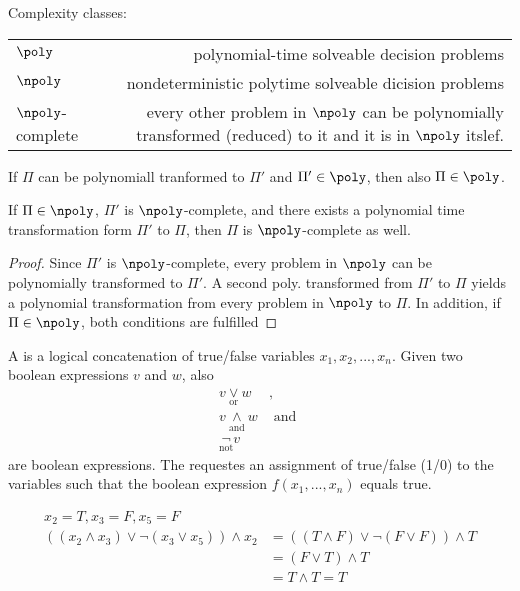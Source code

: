 \begin{lec}[2011-12-19]\end{lec}

Complexity classes:

\begin{tabular}{l|r}
	$\poly$ & polynomial-time solveable decision problems \\
	$\npoly$ & nondeterministic polytime solveable dicision problems \\
	$\npoly$-complete & every other problem in $\npoly$ can be polynomially transformed (reduced) to it and it is in $\npoly$ itslef.
\end{tabular}

\begin{rem}
	If $\Pi$ can be polynomiall tranformed to $\Pi'$ and $\Pi'\in \poly$, then also $\Pi \in \poly$.
\end{rem}

\begin{cor}
	If $\Pi \in \npoly$, $\Pi'$ is $\npoly$-complete, and there exists a polynomial time transformation form $\Pi'$ to $\Pi$, then $\Pi$ is $\npoly$-complete as well.
\end{cor}
\begin{proof}
Since $\Pi'$ is $\npoly$-complete, every problem in $\npoly$ can be polynomially transformed to $\Pi'$. A second poly. transformed from $\Pi'$ to $\Pi$ yields a polynomial transformation from every problem in $\npoly$ to $\Pi$. In addition, if $\Pi \in \npoly$, both conditions are fulfilled
\end{proof}

\begin{defn}
A  is a logical concatenation of true/false variables $x_1, x_2, ..., x_n$. Given two boolean expressions $v$ and $w$, also 
	\begin{align*}
	 v \underset{\text{or}}\vee w &, \\
	 v \underset{\text{and}}\wedge w& \text{ and } \\
	 \underset{\text{not}}\neg v& 
	\end{align*}
	are boolean expressions. The  requestes an assignment of true/false (1/0) to the variables such that the boolean expression $f(x_1, ..., x_n)$ equals true.
\end{defn}



\begin{xmp+}
	\begin{align*}
		x_2=T, x_3=F,x_5=F\\
		((x_2\wedge x_3)\vee \neg(x_3 \vee x_5))\wedge x_2
		&= ((T \wedge F) \vee \neg (F \vee F))\wedge T \\
		&= (F \vee T) \wedge T \\
		&= T \wedge T = T
	\end{align*}
\end{xmp+}	

